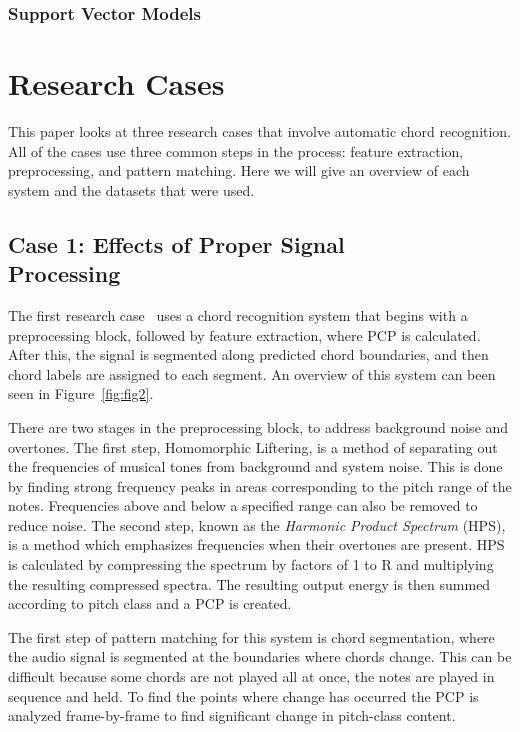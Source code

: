 \documentclass{sig-alternate}
\begin{document}

\subsubsection{Support Vector Models}


\section{Research Cases}

This paper looks at three research cases that involve automatic chord recognition. All of the cases use three common steps in the process: feature extraction, preprocessing, and pattern matching. Here we will give an overview of each system and the datasets that were used.

\subsection{Case 1: Effects of Proper Signal \\ Processing}

The first research case~\cite{Morman:2006} uses a chord recognition system that begins with a preprocessing block, followed by feature extraction, where PCP is calculated. After this, the signal is segmented along predicted chord boundaries, and then chord labels are assigned to each segment. An overview of this system can been seen in Figure~\ref{fig:fig2}. 

There are two stages in the preprocessing block, to address background noise and overtones. The first step, Homomorphic Liftering, is a method of separating out the frequencies of musical tones from background and system noise. This is done by finding strong frequency peaks in areas corresponding to the pitch range of the notes. Frequencies above and below a specified range can also be removed to reduce noise. The second step, known as the \textit{Harmonic Product Spectrum} (HPS), is a method which emphasizes frequencies when their overtones are present. HPS is calculated by compressing the spectrum by factors of 1 to R and multiplying the resulting compressed spectra. The resulting output energy is then summed according to pitch class and a PCP is created.

The first step of pattern matching for this system is chord segmentation, where the audio signal is segmented at the boundaries where chords change. This can be difficult because some chords are not played all at once, the notes are played in sequence and held. To find the points where change has occurred the PCP is analyzed frame-by-frame to find significant change in pitch-class content. 
\end{document}
